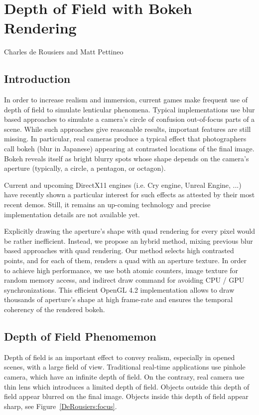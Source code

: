 \chapter{Depth of Field with Bokeh Rendering}{Charles de Rousiers and Matt Pettineo}
\label{BokehRendering}

\section{Introduction}

In order to increase realism and immersion, current games make frequent use of depth of field to simulate lenticular phenomena. Typical implementations use blur based approaches to simulate a camera’s circle of confusion out-of-focus parts of a scene. While such approaches give reasonable results, important features are still missing. In particular, real cameras produce a typical effect that photographers call bokeh (blur in Japanese) appearing at contrasted locations of the final image. Bokeh reveals itself as  bright blurry spots whose shape depends on the camera’s aperture (typically, a circle, a pentagon, or octagon). 

Current and upcoming DirectX11 engines (i.e. Cry engine, Unreal Engine, ...) have recently shown a particular interest for such effects as attested by their most recent demos. Still, it  remains an up-coming technology and precise implementation details are not available yet.

Explicitly drawing the aperture’s shape with quad rendering for every pixel would be rather inefficient. Instead, we propose an hybrid method, mixing previous blur based approaches with quad rendering. Our method selects high contrasted points, and for each of them, renders a quad with an aperture texture. In order to achieve high performance, we use both atomic counters, image texture for random memory access, and indirect draw command for avoiding CPU / GPU synchronizations. This efficient OpenGL 4.2 implementation allows to draw thousands of aperture’s shape at high frame-rate and ensures the temporal coherency of the rendered bokeh.

\section{Depth of Field Phenomemon}\label{Derousiers:DOFPhenomenon}
Depth of field is an important effect to convey realism, especially in opened scenes, with a large field of view. Traditional real-time applications use pinhole camera, which have an infinite depth of field. On the contrary, real camera use thin lens which introduces a limited depth of field. Objects outside this depth of field appear blurred on the final image. Objects inside this depth of field appear sharp, see Figure~\ref{DeRousiers:focus}.

